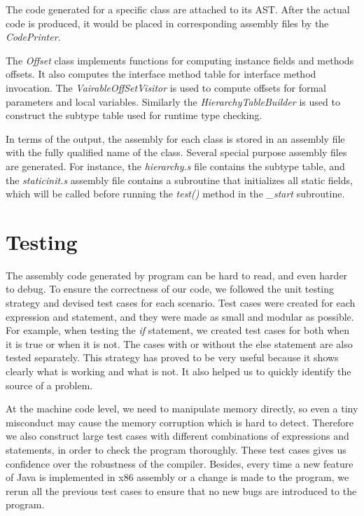 \documentclass[a4paper, notitlepage]{report}
\begin{document}
The code generated for a specific class are attached to its AST. After the actual code is produced, it would be placed in corresponding assembly files by the \emph{CodePrinter}.

The \emph{Offset} class implements functions for computing instance fields and methods offsets. It also computes the interface method table for interface method invocation. The \emph{VairableOffSetVisitor} is used to compute offsets for formal parameters and local variables. Similarly the \emph{HierarchyTableBuilder} is used to construct the subtype table used for runtime type checking.

In terms of the output, the assembly for each class is stored in an assembly file with the fully qualified name of the class. Several special purpose assembly files are generated. For instance, the \emph{hierarchy.s} file contains the subtype table, and the \emph{staticinit.s} assembly file contains a subroutine that initializes all static fields, which will be called before running the \emph{test()} method in the \emph{\_start} subroutine.


\chapter{Testing}
\label{testing}

The assembly code generated by program can be hard to read, and even harder to debug. To ensure the correctness of our code, we followed the unit testing strategy and devised test cases for each scenario. Test cases were created for each expression and statement, and they were made as small and modular as possible. For example, when testing the \emph{if} statement, we created test cases for both when it is true or when it is not. The cases with or without the else statement are also tested separately. This strategy has proved to be very useful because it shows clearly what is  working and what is  not. It also helped us to quickly identify the source of a problem.

At the machine code level, we need to manipulate memory directly, so even a tiny misconduct may cause the memory corruption which is hard to detect. Therefore we also construct large test cases with different combinations of expressions and statements, in order to check the program thoroughly. These test cases gives us confidence over the robustness of the compiler.  Besides, every time a new feature of Java is implemented in x86 assembly or a change is made to the program, we rerun all the previous test cases to ensure that no new bugs are introduced to the program.
\end{document}
